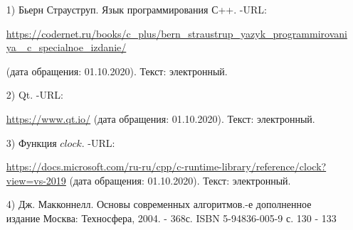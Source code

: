 \documentclass[14pt, a4paper]{extarticle}
\begin{document}
	\begin{enumerate}
		\label{CPlusPlus}
		\item[1)] Бьерн Страуструп. Язык программирования С++. -URL:\par 
		\href{https://codernet.ru/books/c_plus/bern_straustrup_yazyk_programmirovaniya_c_specialnoe_izdanie/}
		{https://codernet.ru/books/c\_plus/bern\_straustrup\_yazyk\_programmirovaniya\_
			c\_specialnoe\_izdanie/}\par(дата обращения:
		01.10.2020). Текст: электронный.
		
		\label{Cute}
		\item[2)] Qt. -URL:\par
		\href{https://www.qt.io/}{https://www.qt.io/} (дата обращения: 01.10.2020). Текст: электронный.
		
		\label{CLOCK}
		\item[3)] Функция $clock$. -URL:\par
		\href{https://docs.microsoft.com/ru-ru/cpp/c-runtime-library/reference/clock?view=vs-2019}{https://docs.microsoft.com/ru-ru/cpp/c-runtime-library/reference/clock?view=vs-2019} (дата обращения:
		01.10.2020). Текст: электронный.
		
		\label{MatrixInfo}
		\item[4)] Дж. Макконнелл. Основы современных алгоритмов.-е дополненное издание
		\newline Москва: Техносфера, 2004. - 368с. ISBN 5-94836-005-9\newline
		с. 130 - 133
		
	\end{enumerate}
\end{document}
